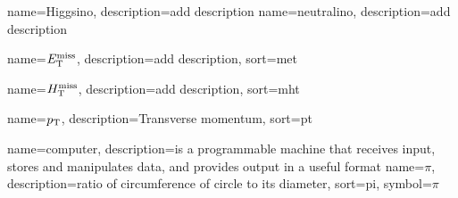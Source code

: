 {
  name=Higgsino,
  description={add description}
}
{
  name=neutralino,
  description={add description}
}

{
  name={\ensuremath{\MET}},
  description={add description},
  sort={met}
}


{
  name={\ensuremath{\mht}},
  description={add description},
  sort={mht}
}
 
{
  name={\ensuremath{\pt}},
  description={Transverse momentum},
  sort={pt}
}



{
  name=computer,
  description={is a programmable machine that receives input,
               stores and manipulates data, and provides
               output in a useful format}
}
{
name={\ensuremath{\pi}},
description={ratio of circumference of circle to its diameter},
sort=pi,
symbol={\ensuremath{\pi}}
 }